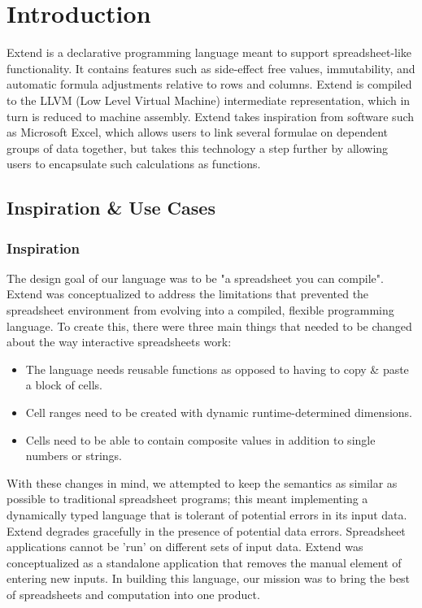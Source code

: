\chapter{Introduction}
Extend is a declarative programming language meant to support spreadsheet-like functionality. It contains features such as side-effect free values, immutability, and automatic formula adjustments relative to rows and columns. Extend is compiled to the LLVM (Low Level Virtual Machine) intermediate representation, which in turn is reduced to machine assembly. Extend takes inspiration from software such as Microsoft Excel, which allows users to link several formulae on dependent groups of data together, but takes this technology a step further by allowing users to encapsulate such calculations as functions.

\section{Inspiration \& Use Cases}

	\subsection{Inspiration}
	The design goal of our language was to be "a spreadsheet you can compile". Extend was conceptualized to address the limitations that prevented the spreadsheet environment from evolving into a compiled, flexible programming language. To create this, there were three main things that needed to be changed about the way interactive spreadsheets work:
		\begin{itemize}
			\item The language needs reusable functions as opposed to having to copy \& paste a block of cells.
			\item Cell ranges need to be created with dynamic runtime-determined dimensions.
			\item Cells need to be able to contain composite values in addition to single numbers or strings.
		\end{itemize}
	With these changes in mind, we attempted to keep the semantics as similar as possible to traditional spreadsheet programs; this meant implementing a dynamically typed language that is tolerant of potential errors in its input data. Extend degrades gracefully in the presence of potential data errors.
	\newline \newline
	Spreadsheet applications cannot be 'run' on different sets of input data. Extend was conceptualized as a standalone application that removes the manual element of entering new inputs. In building this language, our mission was to bring the best of spreadsheets and computation into one product.

